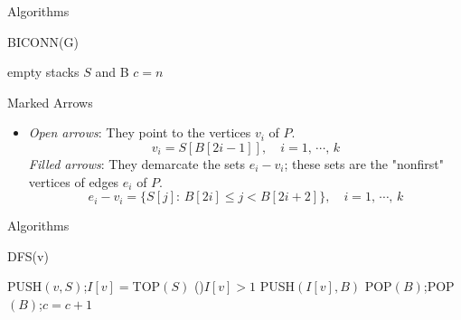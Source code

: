 \documentclass{beamer}
\begin{document}
\begin{frame}{Algorithms}
	\SetAlFnt{\normalsize}
	\begin{procedure}[H]
		\caption{BICONN(G)}
		empty stacks $S$ and B\;
		$c=n$\;
	\end{procedure}
\end{frame}

\begin{frame}{Marked Arrows}
	\begin{itemize}
		\item
		\emph{Open arrows}: They point to the vertices $v_i$ of $P$.
		$$v_i=S[B[2i-1]],\quad i=1,\,\cdots,\,k$$
		\emph{Filled arrows}: They demarcate the sets $e_i-v_i$; these sets
		are the "nonfirst" vertices of edges $e_i$ of $P$.
		$$e_i-v_i=\{S[j]:\,B[2i]\leq j < B[2i+2]\},\quad i=1,\,\cdots,\,k$$
	\end{itemize}
\end{frame}

\begin{frame}{Algorithms}
	\SetAlFnt{\small}
	\begin{procedure}[H]
		\caption{DFS(v)}
		PUSH$(v,S)$;\quad $I[v]=$TOP$(S)$\;
		\If(){$I[v] > 1$}{
			PUSH$(I[v],B)$\;
		}
		 {
			POP$(B)$;\quad POP$(B)$;\quad $c = c + 1$\;
		}
	\end{procedure}
\end{frame}
\end{document}
